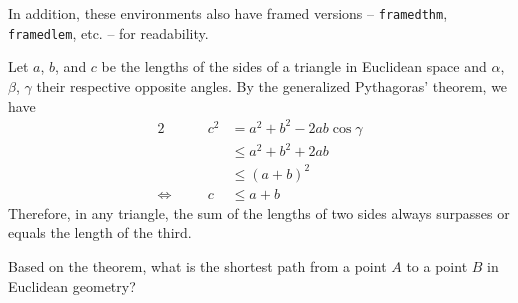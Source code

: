 \documentclass[a4paper, 12pt]{report}
\begin{document}
In addition, these environments also have framed versions -- \texttt{framedthm}, \texttt{framedlem}, etc. -- for readability.


\begin{framedprf}
	Let $a$, $b$, and $c$ be the lengths of the sides of a triangle in Euclidean space and $\alpha$, $\beta$, $\gamma$ their respective opposite angles. By the generalized Pythagoras' theorem, we have
	\begin{alignat*}{2}
		&  & c^2 & = a^2 + b^2 - 2ab \cos\gamma \\
		&  &     & \leq a^2 + b^2 + 2ab         \\
		&  &     & \leq (a + b)^2               \\
		\Leftrightarrow \quad &  & c   & \leq a + b
	\end{alignat*}
	Therefore, in any triangle, the sum of the lengths of two sides always surpasses or equals the length of the third. \qedadd
\end{framedprf}

\begin{framedquest*}
	Based on the theorem, what is the shortest path from a point $A$ to a point $B$ in Euclidean geometry?
\end{framedquest*}

   
\printbibliography
\end{document}
